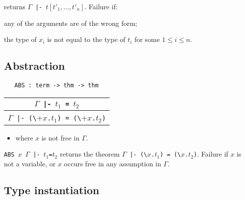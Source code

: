 \bigskip

\noindent returns $\Gamma${\small\verb+ |- +}$t[t'_1,\ldots,t'_n]$.
Failure if:
\begin{myenumerate}
\item any of the arguments are of the wrong form;
\item the type of $x_i$ is not equal to the type of $t_i$ for some
$1\leq i\leq n$.
\end{myenumerate}

\subsection{Abstraction}


\begin{boxed}
\begin{verbatim}
   ABS : term -> thm -> thm
\end{verbatim}\end{boxed}


\begin{center}
\begin{tabular}{c}
$\Gamma${\small\verb+ |- +}$t_1${\small\verb+ = +}$t_2$ \\ \hline
$\Gamma${\small\verb+ |- (\+}$x${\small\verb+.+}$t_1${\small\verb+) = (\+}$x${\small\verb+.+}$t_2${\small\verb+)+} \\
\end{tabular}
\end{center}

\begin{itemize}
\item where $x$ is not free in $\Gamma$.
\end{itemize}

\noindent
{\small\verb+ABS +}$x${\small\verb+ +}$\Gamma${\small\verb+ |- +}$t_1${\small\verb+=+}$t_2$ returns the theorem
$\Gamma${\small\verb+ |- (\+}$x${\small\verb+.+}$t_1${\small\verb+) = (\+}$x${\small\verb+.+}$t_2${\small\verb+)+}.
Failure if $x$ is not a variable, or $x$
 occurs free in any assumption in $\Gamma$.


\bigskip

\subsection{Type instantiation}

